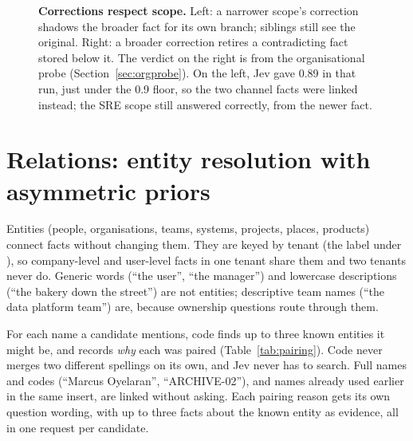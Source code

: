 \begin{figure}[!htb]
\caption{\textbf{Corrections respect scope.} Left: a narrower scope's correction shadows the broader fact for its own
branch; siblings still see the original. Right: a broader correction retires a contradicting fact stored below it. The
verdict on the right is from the organisational probe (Section~\ref{sec:orgprobe}). On the left, Jev gave 0.89 in that
run, just under the 0.9 floor, so the two channel facts were linked instead; the SRE scope still answered correctly,
from the newer fact.}
\label{fig:scopes}
\end{figure}

\section{Relations: entity resolution with asymmetric priors}\label{sec:entities}

Entities (people, organisations, teams, systems, projects, places, products) connect facts without changing them. They
are keyed by tenant (the label under ), so company-level and user-level facts in one tenant share them and
two tenants never do. Generic words (``the user'', ``the manager'') and lowercase descriptions (``the bakery down the
street'') are not entities; descriptive team names (``the data platform team'') are, because ownership questions route
through them.

For each name a candidate mentions, code finds up to three known entities it might be, and records \emph{why} each was
paired (Table~\ref{tab:pairing}). Code never merges two different spellings on its own, and Jev never has to search.
Full names and codes (``Marcus Oyelaran'', ``ARCHIVE-02''), and names already used earlier in the same insert, are
linked without asking. Each pairing reason gets its own question wording, with up to three facts about the known entity
as evidence, all in one request per candidate.

